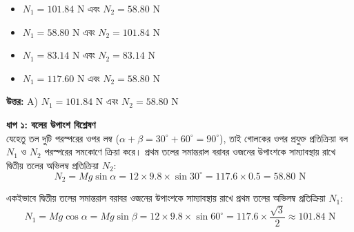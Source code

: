 \documentclass[12pt, a4paper]{article}
\begin{document}
\begin{itemize}[label={}, leftmargin=1cm, itemsep=0.5em]
    \item[\textbf{A)}] $N_1 = 101.84\text{ N}$ এবং $N_2 = 58.80\text{ N}$
    \item[\textbf{B)}] $N_1 = 58.80\text{ N}$ এবং $N_2 = 101.84\text{ N}$
    \item[\textbf{C)}] $N_1 = 83.14\text{ N}$ এবং $N_2 = 83.14\text{ N}$
    \item[\textbf{D)}] $N_1 = 117.60\text{ N}$ এবং $N_2 = 58.80\text{ N}$
\end{itemize}

\vspace{0.5em}
\begin{tcolorbox}[answerbox]
    \textbf{\color{success} উত্তর:} A) $N_1 = 101.84\text{ N}$ এবং $N_2 = 58.80\text{ N}$
\end{tcolorbox}
\vspace{1em}

\begin{tcolorbox}[solutionbox={সমাধান (Solution)}]
    \noindent
    \textbf{ধাপ ১: বলের উপাংশ বিশ্লেষণ} \\
    যেহেতু তল দুটি পরস্পরের ওপর লম্ব ($\alpha + \beta = 30^\circ + 60^\circ = 90^\circ$), তাই গোলকের ওপর প্রযুক্ত প্রতিক্রিয়া বল $N_1$ ও $N_2$ পরস্পরের সমকোণে ক্রিয়া করে। 
    প্রথম তলের সমান্তরাল বরাবর ওজনের উপাংশকে সাম্যাবস্থায় রাখে দ্বিতীয় তলের অভিলম্ব প্রতিক্রিয়া $N_2$:
    \[ N_2 = M g \sin\alpha = 12 \times 9.8 \times \sin 30^\circ = 117.6 \times 0.5 = \mathbf{58.80}\text{ N} \]
    
    একইভাবে দ্বিতীয় তলের সমান্তরাল বরাবর ওজনের উপাংশকে সাম্যাবস্থায় রাখে প্রথম তলের অভিলম্ব প্রতিক্রিয়া $N_1$:
    \[ N_1 = M g \cos\alpha = M g \sin\beta = 12 \times 9.8 \times \sin 60^\circ = 117.6 \times \frac{\sqrt{3}}{2} \approx \mathbf{101.84}\text{ N} \]
\end{tcolorbox}

\newpage
\end{document}
